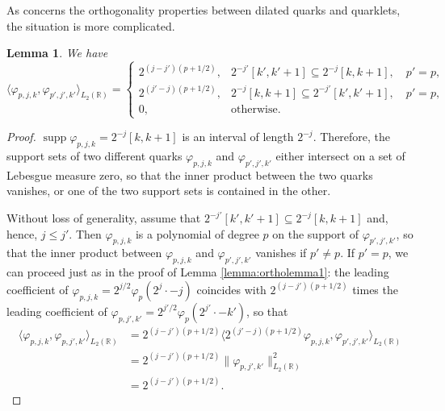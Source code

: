\documentclass{article}
\newtheorem{lemma}[propo]{Lemma}
\DeclareMathOperator{\supp}{supp}
\begin{document}
As concerns the orthogonality properties between dilated quarks and quarklets, the situation is more complicated.
\begin{lemma}
We have
\begin{equation}\label{eq:phipjkphippjpkpproducts}
\langle\varphi_{p,j,k},\varphi_{p',j',k'}\rangle_{L_2(\mathbb R)}
=
\begin{cases}
2^{(j-j')(p+1/2)},&2^{-j'}[k',k'+1]\subseteq 2^{-j}[k,k+1],\quad p'=p,\\
2^{(j'-j)(p+1/2)},&2^{-j}[k,k+1]\subseteq 2^{-j'}[k',k'+1],\quad p'=p,\\
0,&\text{otherwise}.
\end{cases}
\end{equation}
\end{lemma}
\begin{proof}
$\supp\varphi_{p,j,k}=2^{-j}[k,k+1]$ is an interval of length $2^{-j}$. Therefore, the support sets of two different quarks $\varphi_{p,j,k}$ and $\varphi_{p',j',k'}$ either intersect on a set of Lebesgue measure zero, so that the inner product between the two quarks vanishes, or one of the two support sets is contained in the other.

Without loss of generality, assume that $2^{-j'}[k',k'+1]\subseteq 2^{-j}[k,k+1]$ and, hence, $j\le j'$. Then $\varphi_{p,j,k}$ is a polynomial of degree $p$ on the support of $\varphi_{p',j',k'}$, so that the inner product between $\varphi_{p,j,k}$ and $\varphi_{p',j',k'}$ vanishes if $p'\ne p$. If $p'=p$, we can proceed just as in the proof of Lemma \ref{lemma:ortholemma1}: the leading coefficient of $\varphi_{p,j,k}=2^{j/2}\varphi_p(2^j\cdot-j)$ coincides with $2^{(j-j')(p+1/2)}$ times the leading coefficient of $\varphi_{p,j',k'}=2^{j'/2}\varphi_p(2^{j'}\cdot-k')$, so that
\begin{align*}
\langle\varphi_{p,j,k},\varphi_{p,j',k'}\rangle_{L_2(\mathbb R)}
&=
2^{(j-j')(p+1/2)}\langle 2^{(j'-j)(p+1/2)}\varphi_{p,j,k},\varphi_{p',j',k'}\rangle_{L_2(\mathds R)}\\
&=
2^{(j-j')(p+1/2)}\|\varphi_{p,j',k'}\|_{L_2(\mathbb R)}^2\\
&=
2^{(j-j')(p+1/2)}.
\end{align*}
\end{proof}
\end{document}
